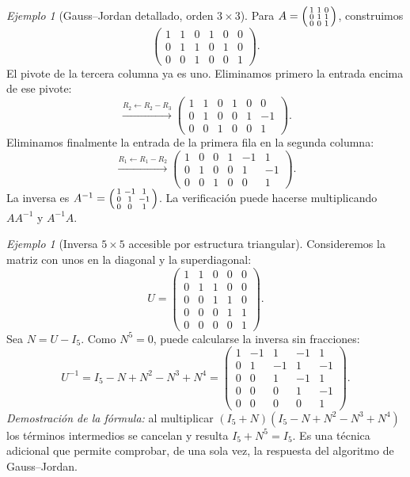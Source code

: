 \documentclass[12pt]{article}
\theoremstyle{remark}
\newtheorem{ejemplo}[definicion]{Ejemplo}
\begin{document}
\begin{ejemplo}[Gauss--Jordan detallado, orden $3\times3$]
Para $A=\begin{psmallmatrix}1&1&0\\0&1&1\\0&0&1\end{psmallmatrix}$, construimos
\[
\left(\begin{array}{ccc|ccc}1&1&0&1&0&0\\0&1&1&0&1&0\\0&0&1&0&0&1\end{array}\right).
\]
El pivote de la tercera columna ya es uno. Eliminamos primero la entrada encima de ese pivote:
\[
\xrightarrow{R_2\leftarrow R_2-R_3}
\left(\begin{array}{ccc|ccc}1&1&0&1&0&0\\0&1&0&0&1&-1\\0&0&1&0&0&1\end{array}\right).
\]
Eliminamos finalmente la entrada de la primera fila en la segunda columna:
\[
\xrightarrow{R_1\leftarrow R_1-R_2}
\left(\begin{array}{ccc|ccc}1&0&0&1&-1&1\\0&1&0&0&1&-1\\0&0&1&0&0&1\end{array}\right).
\]
La inversa es $A^{-1}=\begin{psmallmatrix}1&-1&1\\0&1&-1\\0&0&1\end{psmallmatrix}$. La verificación puede hacerse multiplicando $AA^{-1}$ y $A^{-1}A$.
\end{ejemplo}

\begin{ejemplo}[Inversa $5\times5$ accesible por estructura triangular]
Consideremos la matriz con unos en la diagonal y la superdiagonal:
\[
U=\begin{pmatrix}
1&1&0&0&0\\0&1&1&0&0\\0&0&1&1&0\\0&0&0&1&1\\0&0&0&0&1
\end{pmatrix}.
\]
Sea $N=U-I_5$. Como $N^5=0$, puede calcularse la inversa sin fracciones:
\[
U^{-1}=I_5-N+N^2-N^3+N^4
=\begin{pmatrix}
1&-1&1&-1&1\\0&1&-1&1&-1\\0&0&1&-1&1\\0&0&0&1&-1\\0&0&0&0&1
\end{pmatrix}.
\]
\emph{Demostración de la fórmula:} al multiplicar $(I_5+N)(I_5-N+N^2-N^3+N^4)$ los términos intermedios se cancelan y resulta $I_5+N^5=I_5$. Es una técnica adicional que permite comprobar, de una sola vez, la respuesta del algoritmo de Gauss--Jordan.
\end{ejemplo}
\end{document}
